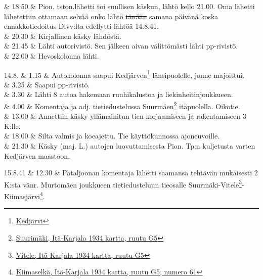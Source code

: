 \documentclass[11pt,a5paper,oneside]{book}
\begin{document}
& 18.50 & Pion. tston.lähetti toi suullisen käskun, lähtö kello 21.00. Oma lähetti lähetettiin ottamaan selvää onko lähtö \sout{tänään} samana päivänä koska ennakkotiedoitus Divv:lta edellytti lähtöä 14.8.41. \\

& 20.30 & Kirjallinen käsky lähdöstä. \\

& 21.45 & Lähti autorivistö. Sen jälkeen aivan välittömästi lähti pp-rivistö. \\

& 22.00 & Hevoskolonna lähti. \\

\taulustop


14.8. & 1.15 & Autokolonna saapui Kedjärven\footnote{\href{https://www.google.fi/maps/place/Ozero+Ked\%22Yarvi/@61.347179,32.4440471,15.26z/}{Kedjärvi}} länsipuolelle, jonne majoittui. \\

& 3.25 & Saapui pp-rivistö. \\

& 3.30 & Lähti 8 autoa hakemaan ruuhikalustoa ja liekinheitinjoukkueen. \\

& 4.00 & Komentaja ja adj. tietiedustelussa Suurmäen\footnote{\href{https://www.google.fi/maps/place/Bol'shiye+Gory,+Republic+of+Karelia,+Russia/}{Suurimäki, Itä-Karjala 1934 kartta, ruutu G5}} itäpuolella. Oikotie. \newline \\

& 13.00 & Annettiin käsky yllämainitun tien korjaamiseen ja rakentamiseen 3 K:lle. \newline \\

& 18.00 & Silta valmis ja koeajettu. \newline Tie käyttökunnossa ajoneuvoille. \newline\newline \\

& 21.30 & Käsky (maj. L.) autojen luovuttamisesta Pion. Tp:n kuljetusta varten Kedjärven maastoon. \\
\newpage

15.8.41 & 12.30 & Pataljoonan komentaja lähetti saamansa tehtävän mukaisesti 2 K:sta vänr. Murtomäen joukkueen tietiedusteluun tieosalle Suurmäki-Vitele\footnote{\href{https://www.google.fi/maps/place/Vidlitsa,+Republic+of+Karelia,+Russia,+186007/}{Vitele, Itä-Karjala 1934 kartta, ruutu G5}}-Kiimasjärvi\footnote{\href{https://www.google.fi/maps/place/Kimusel'gskoye/@61.200226,32.7254117,16z/}{Kiimaselkä, Itä-Karjala 1934 kartta, ruutu G5, numero 61}}. \\
\end{document}
